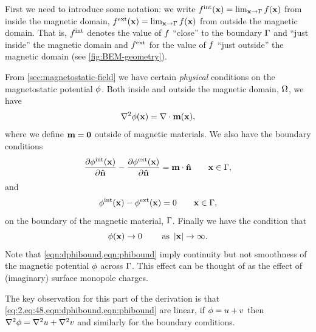 First we need to introduce some notation: we write $f^{\mathrm{int}}(\boldsymbol{\mathrm{x}}) = \lim_{\boldsymbol{\mathrm{x}} \rightarrow {\Gamma}} f(\boldsymbol{\mathrm{x}})$ from inside the magnetic domain, $f^{\mathrm{ext}}(\boldsymbol{\mathrm{x}}) = \lim_{\boldsymbol{\mathrm{x}} \rightarrow {\Gamma}} f(\boldsymbol{\mathrm{x}})$ from outside the magnetic domain.
That is, $f^{\mathrm{int}}$ denotes the value of $f$ ``close'' to the boundary ${\Gamma}$ and ``just inside'' the magnetic domain and $f^{\mathrm{ext}}$ for the value of $f$ ``just outside'' the magnetic domain (see \cref{fig:BEM-geometry}).

From \cref{sec:magnetostatic-field} we have certain \emph{physical} conditions on the magnetostatic potential $\phi$.
Both inside and outside the magnetic domain, $\Omega$, we have
\begin{equation}
  \nabla^2 \phi(\boldsymbol{\mathrm{x}}) = \nabla \cdot \boldsymbol{\mathrm{m}}(\boldsymbol{\mathrm{x}}),
  \label{eq:2}
\end{equation}
where we define $\boldsymbol{\mathrm{m}} = \mathbf{0}$ outside of magnetic materials.
We also have the boundary conditions
\begin{equation}
  \frac{\partial \phi^{\mathrm{int}}(\boldsymbol{\mathrm{x}})}{\partial \boldsymbol{\mathrm{\hat{n}}}} - \frac{\partial \phi^{\mathrm{ext}}(\boldsymbol{\mathrm{x}})}{\partial \boldsymbol{\mathrm{\hat{n}}}} = \boldsymbol{\mathrm{m}} \cdot \boldsymbol{\mathrm{\hat{n}}} \qquad \boldsymbol{\mathrm{x}} \in {\Gamma},
  \label{eqn:dphibound}
\end{equation}
and
\begin{equation}
  \phi^{\mathrm{int}}(\boldsymbol{\mathrm{x}}) - \phi^{\mathrm{ext}}(\boldsymbol{\mathrm{x}})  = 0 \qquad \boldsymbol{\mathrm{x}} \in {\Gamma},
  \label{eqn:phibound}
\end{equation}
on the boundary of the magnetic material, ${\Gamma}$.
Finally we have the condition that
\begin{equation}
  \phi(\boldsymbol{\mathrm{x}}) \rightarrow 0 \qquad \text{ as } \left|{\boldsymbol{\mathrm{x}}} \right| \rightarrow \infty.
  \label{eq:48}
\end{equation}
Note that \cref{eqn:dphibound,eqn:phibound} imply continuity but not smoothness of the magnetic potential $\phi$ across ${\Gamma}$. This effect can be thought of as the effect of (imaginary) surface monopole charges.

The key observation for this part of the derivation is that \cref{eq:2,eq:48,eqn:dphibound,eqn:phibound} are linear, \ie if $\phi = u + v$ then $\nabla^2 \phi = \nabla^2 u + \nabla^2 v$ and similarly for the boundary conditions.

